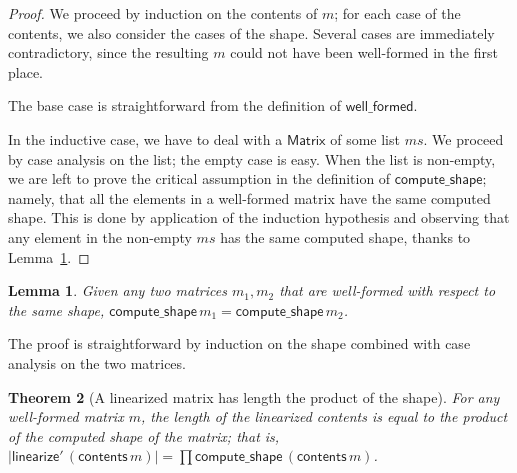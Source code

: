 \documentclass[11pt,conference]{IEEEtran}
\newcommand{\var}[1]{\mathit{#1}}
\newcommand{\func}[1]{\mathsf{#1}}
\theoremstyle{plain} %
\newtheorem{thm}{Theorem}[section]
\newtheorem{lem}[thm]{Lemma}
\theoremstyle{definition}
\theoremstyle{remark}
\begin{document}
\begin{proof}
    We proceed by induction on the contents of \(m\); for each case of the
    contents, we also consider the cases of the shape. Several cases are
    immediately contradictory, since the resulting \(m\) could not have been
    well-formed in the first place.

    The base case is straightforward from the definition of
    \(\func{well\_formed}\).

    In the inductive case, we have to deal with a \(\func{Matrix}\) of some list
    \(\var{ms}\). We proceed by case analysis on the list; the empty case is
    easy. When the list is non-empty, we are left to prove the critical
    assumption in the definition of \(\func{compute\_shape}\); namely, that all
    the elements in a well-formed matrix have the same computed shape. This is
    done by application of the induction hypothesis and observing that any
    element in the non-empty \(\var{ms}\) has the same computed shape, thanks to
    Lemma~\ref{Lem:wf_same_shape}.
\end{proof}

\begin{lem}\label{Lem:wf_same_shape}
    Given any two matrices \(m_1, m_2\) that are well-formed with respect to the
    same shape, \(\func{compute\_shape}\, m_1 = \func{compute\_shape}\, m_2\).
\end{lem}

The proof is straightforward by induction on the shape combined with case
analysis on the two matrices.

\begin{thm}[A linearized matrix has length the product of the shape]\label{Th:linearize_product}
    For any well-formed matrix \(m\), the length of the linearized contents is
    equal to the product of the computed shape of the matrix; that is,
    \(|\func{linearize'}\, (\func{contents}\, m)| = \prod
    \func{compute\_shape}\, (\func{contents}\, m)\).
\end{thm}
\end{document}
